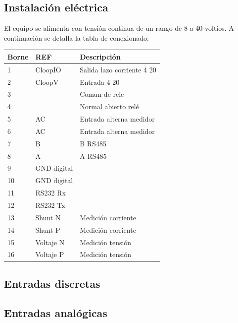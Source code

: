 \subsection{Instalación eléctrica }
El equipo se alimenta con tensión continua de un rango de 8 a 40 voltios.
A continuación se detalla la tabla de conexionado:
\begin{table}[!htb]
\begin{tabular}{@{}lll@{}}
\toprule
Borne & REF         & Descripción                \\ \midrule
1     & CloopIO     & Salida lazo corriente 4 20 \\
2     & CloopV      & Entrada 4 20               \\
3     &             & Comun de rele              \\
4     &             & Normal abierto relé        \\
5     & AC          & Entrada alterna medidor    \\
6     & AC          & Entrada alterna medidor    \\
7     & B           & B RS485                    \\
8     & A           & A RS485                    \\
9     & GND digital &                            \\
10    & GND digital &                            \\
11    & RS232 Rx    &                            \\
12    & RS232 Tx    &                            \\
13    & Shunt N     & Medición corriente         \\
14    & Shunt P     & Medición corriente         \\
15    & Voltaje N   & Medición tensión           \\
16    & Voltaje P   & Medición tensión           \\ \bottomrule
\end{tabular}
\end{table}


\subsection{Entradas discretas}

\subsection{Entradas analógicas}

